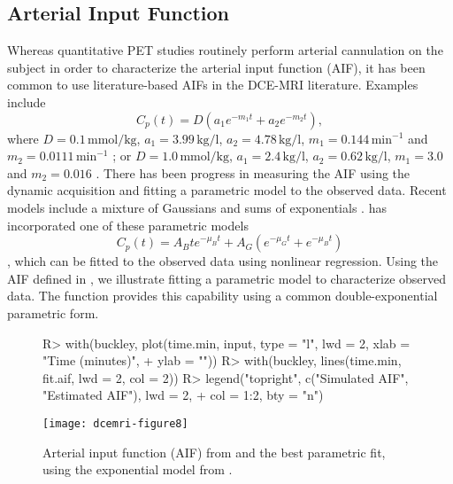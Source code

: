 \documentclass[article]{jss}
\begin{document}
\subsection{Arterial Input Function}

Whereas quantitative PET studies routinely perform arterial
cannulation on the subject in order to characterize the arterial input
function (AIF), it has been common to use literature-based AIFs in the
DCE-MRI literature.  Examples include
\begin{equation*}
  C_p(t) = D \left( a_1 e^{-m_1t} + a_2 e^{-m_2t} \right),
\end{equation*}
where $D=0.1\,\text{mmol/kg}$, $a_1=3.99\,\text{kg/l}$,
$a_2=4.78\,\text{kg/l}$, $m_1=0.144\,\text{min}^{-1}$ and
$m_2=0.0111\,\text{min}^{-1}$
\citep{wei-lan-mut:pharmacokinetics,tof-ker:measurement}; or
$D=1.0\,\text{mmol/kg}$, $a_1=2.4\,\text{kg/l}$,
$a_2=0.62\,\text{kg/l}$, $m_1=3.0$ and $m_2=0.016$
\citep{fri-etal:measurement}.  There has been progress in measuring
the AIF using the dynamic acquisition and fitting a parametric model
to the observed data.  Recent models include a mixture of Gaussians
\citep{par-etal:derived} and sums of exponentials
\citep{ort-etal:efficient}.   has incorporated
one of these parametric models 
\begin{equation*}
  C_p(t) = A_B t e^{-\mu_Bt} + A_G \left( e^{-\mu_Gt} + e^{-\mu_Bt}\right)
\end{equation*}
\citep{ort-etal:efficient}, which can be fitted to the observed data
using nonlinear regression.  Using the AIF defined in
\cite{buc:uncertainty}, we illustrate fitting a parametric model to
characterize observed data.  The  function provides
this capability using a common double-exponential parametric form.

\begin{Schunk}
\end{Schunk}
\begin{figure}[!htbp]
\begin{center}
\begin{Schunk}
\begin{Sinput}
R> with(buckley, plot(time.min, input, type = "l", lwd = 2, xlab = "Time (minutes)", 
+     ylab = ""))
R> with(buckley, lines(time.min, fit.aif, lwd = 2, col = 2))
R> legend("topright", c("Simulated AIF", "Estimated AIF"), lwd = 2, 
+     col = 1:2, bty = "n")
\end{Sinput}
\end{Schunk}
\texttt{[image: dcemri-figure8]}
\end{center}
\caption{Arterial input function (AIF) from \cite{buc:uncertainty} and
  the best parametric fit, using the exponential model from
  \cite{ort-etal:efficient}.}
\label{fig:fitted-aif}
\end{figure}
\end{document}
